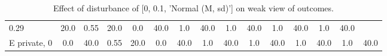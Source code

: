 \begin{table}
\begin{tabular}{l|cc|cc|cc|cc|cc|cc|cc}
\cellcolor{Bittersweet}0.29&\cellcolor{Bittersweet}20.0&\cellcolor{Bittersweet}0.55&\cellcolor{Bittersweet}20.0&\cellcolor{Bittersweet}0.0&\cellcolor{Bittersweet}40.0&\cellcolor{Bittersweet}1.0&\cellcolor{Bittersweet}40.0&\cellcolor{Bittersweet}1.0&\cellcolor{Bittersweet}40.0&\cellcolor{Bittersweet}1.0&\cellcolor{Bittersweet}40.0&\cellcolor{Bittersweet}1.0&\cellcolor{Bittersweet}40.0\\E private, 0 & \cellcolor{Bittersweet}0.0&\cellcolor{Bittersweet}40.0&\cellcolor{Bittersweet}0.55&\cellcolor{Bittersweet}20.0&\cellcolor{Bittersweet}0.0&\cellcolor{Bittersweet}40.0&\cellcolor{Bittersweet}1.0&\cellcolor{Bittersweet}40.0&\cellcolor{Bittersweet}1.0&\cellcolor{Bittersweet}40.0&\cellcolor{Bittersweet}1.0&\cellcolor{Bittersweet}40.0&\cellcolor{Bittersweet}1.0&\cellcolor{Bittersweet}40.0\\\bottomrule\end{tabular}\caption{Effect of disturbance of [0, 0.1, 'Normal (M, sd)'] on weak view of outcomes.}\end{table}
